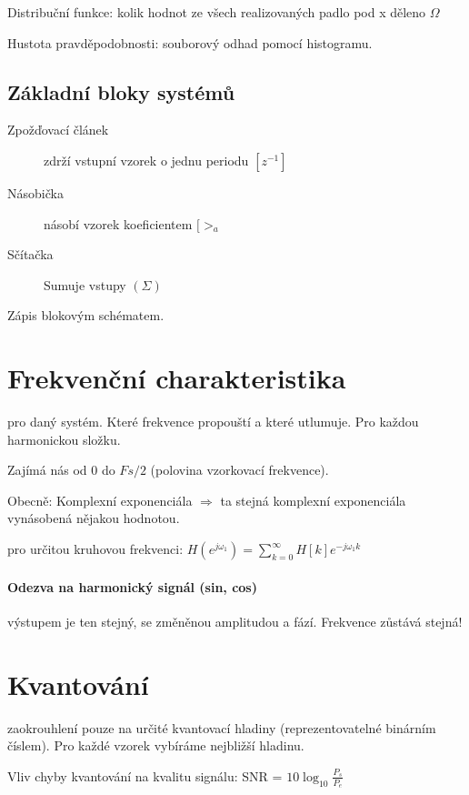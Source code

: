 \documentclass[a4paper, 11pt]{report}
\begin{document}
Distribuční funkce: kolik hodnot ze všech realizovaných padlo pod x děleno $\Omega$

Hustota pravděpodobnosti: souborový odhad pomocí histogramu.

\subsection{Základní bloky systémů}
\begin{description}
	\item[Zpožďovací článek] zdrží vstupní vzorek o jednu periodu $[z^{-1}]$
	\item[Násobička] násobí vzorek koeficientem $[>_a$
	\item[Sčítačka] Sumuje vstupy $(\Sigma)$
\end{description}

Zápis blokovým schématem.

\section{Frekvenční charakteristika}
pro daný systém. Které frekvence propouští a které utlumuje. Pro každou harmonickou složku.

Zajímá nás od 0 do $Fs/2$ (polovina vzorkovací frekvence).

Obecně: Komplexní exponenciála $\Rightarrow$ ta stejná komplexní exponenciála vynásobená nějakou hodnotou.

pro určitou kruhovou frekvenci: $H(e^{j\omega_1}) = \sum\limits_{k = 0}^{\infty} H[k]e^{-j\omega_1 k}$

\paragraph{Odezva na harmonický signál (sin, cos)} výstupem je ten stejný, se změněnou amplitudou a fází. Frekvence zůstává stejná!



\section{Kvantování}
zaokrouhlení pouze na určité kvantovací hladiny (reprezentovatelné binárním číslem). Pro každé vzorek vybíráme nejbližší hladinu.

Vliv chyby kvantování na kvalitu signálu: SNR = $10 \log_{10}{\frac{P_s}{P_e}}$
\end{document}
